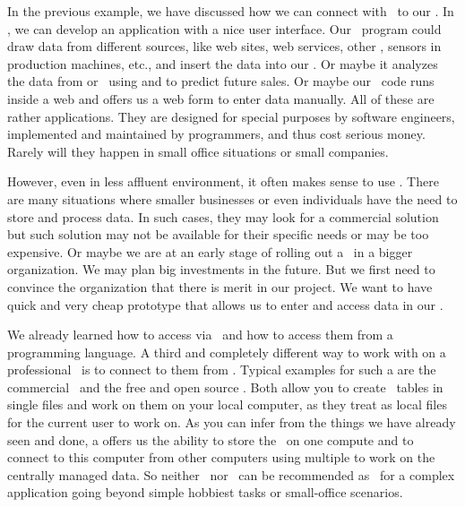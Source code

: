 %
%
\label{sec:accessingDbFromLibreOfficeBase}%
%
In the previous example, we have discussed how we can connect with \python\ to our \dbms.
In \python, we can develop an application with a nice user interface.
Our \python\ program could draw data from different sources, like web sites, web services, other , sensors in production machines, etc., and insert the data into our \db.
Or maybe it analyzes the data from or \db\ using  and  to predict future sales.
Or maybe our \python\ code runs inside a web  and offers us a web form to enter data manually.
All of these are rather  applications.
They are designed for special purposes by software engineers, implemented and maintained by programmers, and thus cost serious money.
Rarely will they happen in small office situations or small companies.

However, even in less affluent environment, it often makes sense to use .
There are many situations where smaller businesses or even individuals have the need to store and process data.
In such cases, they may look for a commercial solution but such solution may not be available for their specific needs or may be too expensive.
Or maybe we are at an early stage of rolling out a \db\ in a bigger organization.
We may plan big investments in the future.
But we first need to convince the organization that there is merit in our project.
We want to have quick and very cheap prototype that allows us to enter and access data in our \db.

We already learned how to access  via \sql\ and how to access them from a programming language.
A third and completely different way to work with  on a professional \dbms\ is to connect to them from .
Typical examples for such a  are the commercial \microsoftAccess\ and the free and open source \libreofficeBase.
Both allow you to create \db\ tables in single files and work on them on your local computer, as they treat  as local files for the current user to work on.
As you can infer from the things we have already seen and done, a  offers us the ability to store the \db\ on one compute and to connect to this computer from other computers using multiple  to work on the centrally managed data.
So neither \microsoftAccess\ nor \libreofficeBase\ can be recommended as \dbms\ for a complex application going beyond simple hobbiest tasks or small-office scenarios.

